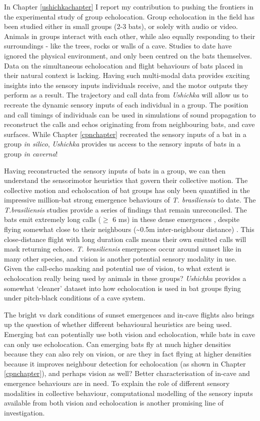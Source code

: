 \documentclass[
]{book}
\begin{document}
In Chapter \ref{ushichkachapter} I report my contribution to pushing the frontiers in the experimental study of group echolocation. Group echolocation in the field has been studied either in small groups (2-3 bats), or solely with audio or video. Animals in groups interact with each other, while also equally responding to their surroundings - like the trees, rocks or walls of a cave. Studies to date have ignored the physical environment, and only been centred on the bats themselves. Data on the simultaneous echolocation and flight behaviours of bats placed in their natural context is lacking. Having such multi-modal data provides exciting insights into the sensory inputs individuals receive, and the motor outputs they perform as a result. The trajectory and call data from \emph{Ushichka} will allow us to recreate the dynamic sensory inputs of each individual in a group. The position and call timings of individuals can be used in simulations of sound propagation to reconstruct the calls and echos originating from from neighbouring bats, and cave surfaces. While Chapter \ref{cpnchapter} recreated the sensory inputs of a bat in a group \emph{in silico}, \emph{Ushichka} provides us access to the sensory inputs of bats in a group \emph{in caverna}!

Having reconstructed the sensory inputs of bats in a group, we can then understand the sensorimotor heuristics that govern their collective motion. The collective motion and echolocation of bat groups has only been quantified in the impressive million-bat strong emergence behaviours of \emph{T. brasiliensis} to date. The \emph{T.brasiliensis} studies provide a series of findings that remain unreconciled. The bats emit extremely long calls (\(\geq\) 6 ms) in these dense emergences \citep{gillam2010a}, despite flying somewhat close to their neighbours (\textasciitilde0.5m inter-neighbour distance) \citep{theriault2010a}. This close-distance flight with long duration calls means their own emitted calls will mask returning echoes. \emph{T. brasiliensis} emergences occur around sunset like in many other species, and vision is another potential sensory modality in use. Given the call-echo masking and potential use of vision, to what extent is echolocation really being used by animals in these groups? \emph{Ushichka} provides a somewhat `cleaner' dataset into how echolocation is used in bat groups flying under pitch-black conditions of a cave system.

The bright vs dark conditions of sunset emergences and in-cave flights also brings up the question of whether different behavioural heuristics are being used. Emerging bat can potentially use both vision and echolocation, while bats in cave can only use echolocation. Can emerging bats fly at much higher densities because they can also rely on vision, or are they in fact flying at higher densities because it improves neighbour detection for echolocation (as shown in Chapter \ref{cpnchapter}), and perhaps vision as well? Better characterisation of in-cave and emergence behaviours are in need. To explain the role of different sensory modalities in collective behaviour, computational modelling of the sensory inputs available from both vision and echolocation \citep{bar2015sensory} is another promising line of investigation.
\end{document}
